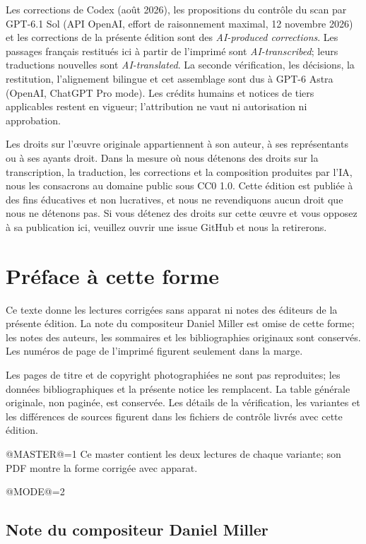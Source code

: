 \documentclass[oneside]{book}
\makeatletter
\theoremstyle{sga-source}
\theoremstyle{sga-source-dash}
\theoremstyle{sga-source-dotdash}
\theoremstyle{sga-source-number-note-dash}
\theoremstyle{sga-source-note-number-dotdash}
\theoremstyle{sga-source-example-dotdash}
\theoremstyle{sga-source-inline-number}
\theoremstyle{sga-source-bare-number}
\theoremstyle{sga-source}
\providecommand\EditionMode{@MODE@}
\providecommand\EditionIsMaster{@MASTER@}
\makeatother
\begin{document}
\medskip
Les corrections de Codex (août 2026), les propositions du contrôle du scan
par GPT-6.1 Sol (API OpenAI, effort de raisonnement maximal, 12 novembre
2026) et les corrections de la présente édition sont des
\emph{AI-produced corrections}. Les passages français restitués ici à
partir de l’imprimé sont \emph{AI-transcribed}; leurs traductions nouvelles
sont \emph{AI-translated}. La seconde vérification, les décisions, la
restitution, l’alignement bilingue et cet assemblage sont dus à GPT-6 Astra
(OpenAI, ChatGPT Pro mode). Les crédits humains et notices de tiers
applicables restent en vigueur; l’attribution ne vaut ni autorisation ni
approbation.

\medskip
Les droits sur l'œuvre originale appartiennent à son auteur, à ses représentants ou à ses ayants
droit. Dans la mesure où nous détenons des droits sur la transcription, la traduction, les corrections et la
composition produites par l'IA, nous les consacrons au domaine public sous CC0 1.0. Cette édition est publiée
à des fins éducatives et non lucratives, et nous ne revendiquons aucun droit que nous ne détenons pas. Si vous
détenez des droits sur cette œuvre et vous opposez à sa publication ici, veuillez ouvrir une issue GitHub et
nous la retirerons.

\chapter*{Préface à cette forme}
Ce texte donne les lectures corrigées sans apparat ni notes des
éditeurs de la présente édition. La note du compositeur Daniel Miller est
omise de cette forme; les notes des auteurs, les sommaires et les
bibliographies originaux sont conservés. Les numéros de page de l’imprimé
figurent seulement dans la marge.

Les pages de titre et de copyright photographiées ne sont pas reproduites;
les données bibliographiques et la présente notice les remplacent. La
table générale originale, non paginée, est conservée. Les détails de la
vérification, les variantes et les différences de sources figurent dans
les fichiers de contrôle livrés avec cette édition.

\ifnum\EditionIsMaster=1\relax
Ce master contient les deux lectures de chaque variante; son PDF montre la forme corrigée avec apparat.
\fi

\clearpage

\fi
\ifnum\EditionMode=2\relax\else

\section*{Note du compositeur Daniel Miller}
\end{document}
